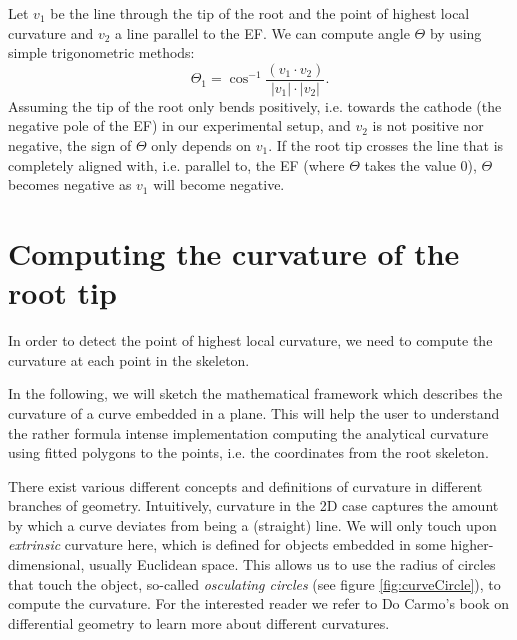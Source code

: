 

Let \( v_{1} \) be the line through the tip of the root and the point of highest local curvature and \(v_{2} \) a line parallel to the EF. 
We can compute angle \( \Theta \)  by using simple trigonometric methods:
\begin{equation} \label{angle1}
\Theta_{1}  = \cos^{-1}\frac{( v_{1} \cdot v_{2}) }{ | v_{1} | \cdot | v_{2} |}.
\end{equation}
Assuming the tip of the root only bends positively, i.e. towards the cathode (the negative pole of the EF) in our experimental setup, and \( v_{2} \) is not positive nor negative, the sign of \(\Theta \) only depends on \( v_{1} \). If the root tip crosses the line that is completely aligned with, i.e. parallel to, the EF (where \( \Theta \) takes the value 0), \( \Theta \) becomes negative as \( v_{1} \) will become negative. 


\section{Computing the curvature of the root tip}


In order to detect the point of highest local curvature, we need to compute the curvature at each point in the skeleton. 


In the following, we will sketch the mathematical framework which describes the curvature of a curve embedded in a plane.
This will help the user to understand the rather formula intense implementation computing the analytical curvature using fitted polygons to the points, i.e. the coordinates from the root skeleton.

There exist various different concepts and definitions of curvature in different branches of geometry.
Intuitively, curvature in the 2D case captures the amount by which a curve deviates from being a (straight) line.
We will only touch upon \textit{extrinsic} curvature here, which is defined for objects embedded in some higher-dimensional, usually Euclidean space. This allows us to use the radius of circles that touch the object, so-called \textit{osculating circles} (see figure \ref{fig:curveCircle}), to compute the curvature. 
For the interested reader we refer to Do Carmo's book on differential geometry \cite{do2016differential} to learn more about different curvatures.

